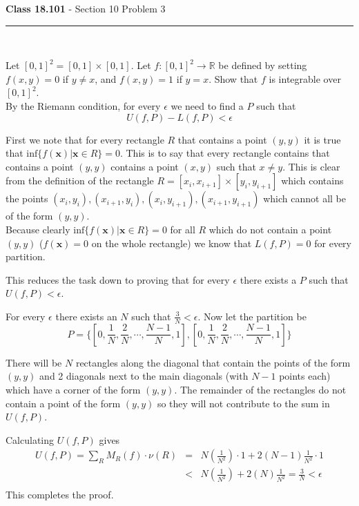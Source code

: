 \documentclass[11pt,reqno]{article}
\begin{document}
\begin{flushleft} 
\textbf{Class 18.101} - Section 10 Problem 3\\
\rule{500pt}{1pt}\\
\end{flushleft} 

Let $[0,1]^2 = [0,1] \times [0,1]$. Let $f : [0,1]^2 \to \mathbb{R}$ be defined by setting $f(x,y) = 0$ if $y \neq x$, and $f(x,y) = 1$ if $y = x$. Show that $f$ is integrable over $[0,1]^2$.\\

\noindent By the Riemann condition, for every $\epsilon$ we need to find a $P$ such that 
\[ U(f,P) - L(f,P) < \epsilon \]

First we note that for every rectangle $R$ that contains a point $(y,y)$ it is true that $\text{inf} \{ f(\textbf{x}) | \textbf{x} \in R\} = 0$. This is to say that every rectangle contains that contains a point $(y,y)$ contains a point $(x,y)$ such that $x \neq y$. This is clear from the definition of the rectangle $R = [x_i,x_{i+1}] \times  [y_i,y_{i+1}]$ which contains the points $(x_i,y_i),(x_{i+1},y_i),(x_i,y_{i+1}),(x_{i+1},y_{i+1})$ which cannot all be of the form $(y,y)$. \\
Because clearly $\text{inf} \{ f(\textbf{x}) | \textbf{x} \in R\} = 0$ for all $R$ which do not contain a point $(y,y)$ ($f(\textbf{x}) = 0$ on the whole rectangle) we know that $L(f,P) = 0$ for every partition.

This reduces the task down to proving that for every $\epsilon$ there exists a $P$ such that $U(f,P) < \epsilon$. 

\noindent For every $\epsilon$ there exists an $N$ such that $\frac{3}{N} < \epsilon$. Now let the partition be 
\[ P = \{ [0,\frac{1}{N},\frac{2}{N},\cdots,\frac{N-1}{N},1] , [0,\frac{1}{N},\frac{2}{N},\cdots,\frac{N-1}{N},1] \} \]

There will be $N$ rectangles along the diagonal that contain the points of the form $(y,y)$ and 2 diagonals next to the main diagonals (with $N-1$ points each) which have a corner of the form $(y,y)$. The remainder of the rectangles do not contain a point of the form $(y,y)$ so they will not contribute to the sum in $U(f,P)$.

\noindent Calculating $U(f,P)$ gives
\begin{eqnarray*} 
U(f,P) =   \sum_R M_R(f) \cdot \nu (R) &=& N(\frac{1}{N^2}) \cdot 1 + 2(N-1)\frac{1}{N^2} \cdot 1\\
&<& N(\frac{1}{N^2}) + 2(N)\frac{1}{N^2}  = \frac{3}{N} < \epsilon \\
\end{eqnarray*}
This completes the proof.
\end{document}
